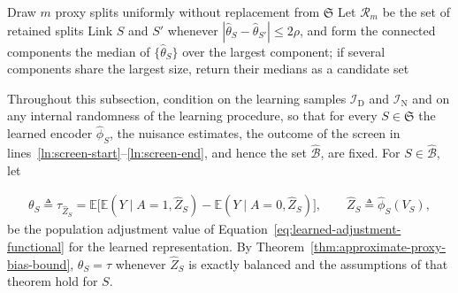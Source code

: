 \begin{algorithm}[t]
\caption{PROBE with proxy-split search}
\label{alg:probe-search}
	Draw $m$ proxy splits uniformly without replacement from $\mathfrak S$\label{ln:sample}\;
	Let $\mathcal R_m$ be the set of retained splits\label{ln:screen-end}\;
	Link $S$ and $S'$ whenever $|\widehat\theta_S-\widehat\theta_{S'}|\le2\rho$, and form the connected components\label{ln:link}\;
	\Return the median of $\{\widehat\theta_S\}$ over the largest component; if several components share the largest size, return their medians as a candidate set\label{ln:return}\;
\end{algorithm}

Throughout this subsection, condition on the learning samples $\mathcal I_{\mathrm D}$ and $\mathcal I_{\mathrm N}$ and on any internal randomness of the learning procedure, so that for every $S\in\mathfrak S$ the learned encoder $\widehat\phi_S$, the nuisance estimates, the outcome of the screen in lines~\ref{ln:screen-start}--\ref{ln:screen-end}, and hence the set $\widehat{\mathcal B}$, are fixed. For $S\in\widehat{\mathcal B}$, let

\begin{align}\label{eq:learned-candidate-value}
	\theta_S\triangleq\tau_{\widehat Z_S}
	=\mathbb E\bigl[\mathbb E(Y\mid A=1,\widehat Z_S)-\mathbb E(Y\mid A=0,\widehat Z_S)\bigr],
	\qquad
	\widehat Z_S\triangleq\widehat\phi_S(V_S),
\end{align}
be the population adjustment value of Equation~\eqref{eq:learned-adjustment-functional} for the learned representation. By Theorem~\ref{thm:approximate-proxy-bias-bound}, $\theta_S=\tau$ whenever $\widehat Z_S$ is exactly balanced and the assumptions of that theorem hold for $S$.

